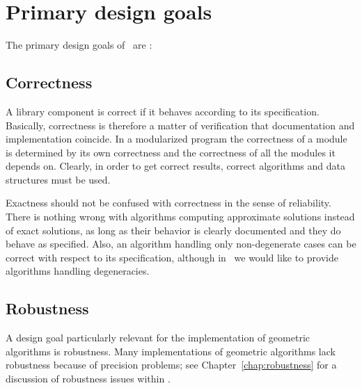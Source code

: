 
\section{Primary design goals\label{sec:design_goals}}
The primary design goals of \cgal\ are \cite{fgkss-dccga-00}:

\subsection*{Correctness}
A library component is correct if it behaves according to its
specification. 
Basically, correctness is therefore a matter of 
verification that documentation and implementation coincide.
In a modularized program the correctness of a module is determined 
by its own correctness and the correctness of all the modules it depends on.  
Clearly, in order to get correct results, correct algorithms and data 
structures must be used. 

Exactness should not be confused with correctness in the sense of
reliability. There is nothing wrong with algorithms computing approximate 
solutions instead of exact solutions, as long as their 
behavior is clearly documented and they do behave as specified.
Also, an algorithm handling only non-degenerate cases can be
correct with respect to its specification, although in \cgal\ we would
like to provide algorithms handling degeneracies. 

\subsection*{Robustness}
A design goal particularly relevant for the implementation of
geometric algorithms is robustness.  Many implementations of geometric
algorithms lack robustness because of precision problems; see 
Chapter~\ref{chap:robustness} for a discussion of robustness issues within 
\cgal.

